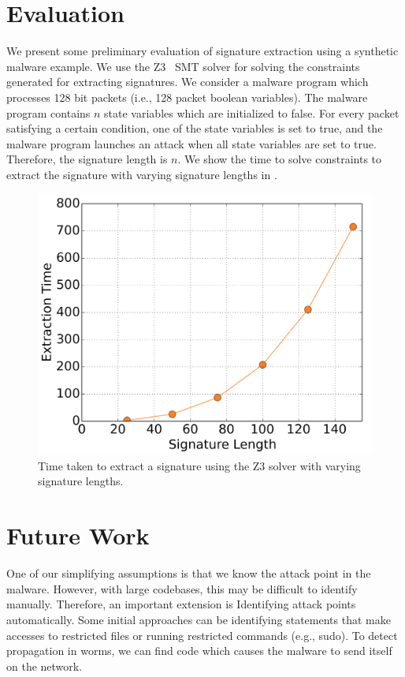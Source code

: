 \documentclass[twocolumn, 11pt]{paper}
\begin{document}
\section{Evaluation}
We present some preliminary evaluation of signature extraction using
a synthetic malware example. We use the Z3~\cite{z3} SMT solver 
for solving the constraints generated for extracting signatures. 
We consider a malware program which processes 128 bit packets (i.e.,
128 packet boolean variables). The malware program contains $n$ state
variables which are initialized to false. For every packet satisfying 
a certain condition, one of the state variables is set to true, and the 
malware program launches an attack when all state variables are 
set to true. Therefore, the signature length is $n$. We show the 
time to solve constraints to extract the signature with varying 
signature lengths in .
\begin{figure}
	\centering
	\includegraphics[width=\columnwidth]{plot.png}
	\caption{Time taken to extract a signature using the Z3 solver
		with varying signature lengths.}
	\label{fig:eval}
\end{figure}

\section{Future Work}
One of our simplifying assumptions is that we know the attack 
point in the malware. However, with large codebases, this may be 
difficult to identify manually. Therefore, an important extension is 
Identifying attack points automatically. Some initial approaches can
be identifying statements that make accesses to restricted files or 
running restricted commands (e.g., sudo). To detect propagation
in worms, 
we can find code which causes the malware to send itself on the 
network. 
\end{document}
